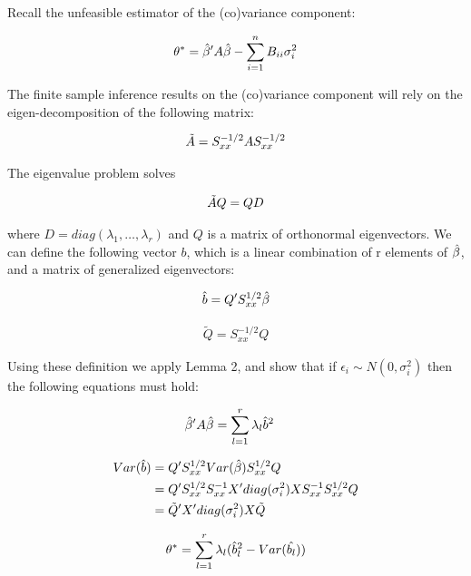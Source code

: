 \documentclass[12pt]{article}
\begin{document}
Recall the unfeasible estimator of the (co)variance component: 

\begin{align}
\theta^* = \Hat{\beta}' A \Hat{\beta} - \sum_{i=1}^n B_{ii} \sigma_i^2
\end{align}

The finite sample inference results on the (co)variance component will rely on the eigen-decomposition of the following matrix:

\begin{align}
    \Tilde{A} = S_{xx}^{-1/2}  A S_{xx}^{-1/2} 
\end{align}

The eigenvalue problem solves

\begin{align}
    \Tilde{A}  Q = Q D
\end{align}

where $D=diag(\lambda_1,\dots,\lambda_r)$ and $Q$ is a matrix of orthonormal eigenvectors. We can define the following vector $b$, which is a linear combination of r elements of $\Hat{\beta}$, and a matrix of generalized eigenvectors:

\begin{align}
    \Hat{b} = Q' S_{xx}^{1/2} \Hat{\beta}
\end{align}

\begin{align}
    \tilde{Q} = S_{xx}^{-1/2} Q  
\end{align}



Using these definition we apply Lemma 2, and show that if $\epsilon_i \sim N(0,\sigma_i^2)$ then the following equations must hold: 


\begin{align}
\Hat{\beta}' A \Hat{\beta} &= \sum_{l=1}^r \lambda_l \Hat{b}^2  
\end{align}

\begin{align}
Var(\Hat{b}) &= Q' S_{xx}^{1/2} Var(\Hat{\beta}) S_{xx}^{1/2}Q \\
&= Q' S_{xx}^{1/2} S_{xx}^{-1} X' diag(\sigma_i^2) X S_{xx}^{-1}  S_{xx}^{1/2} Q \\
&= \Tilde{Q}' X' diag(\sigma_i^2) X \Tilde{Q}
\end{align}

\begin{align}
    \theta^* = \sum_{l=1}^r \lambda_l (\Hat{b}_l^2 - Var(\Hat{b_l}))
\end{align}
\end{document}
